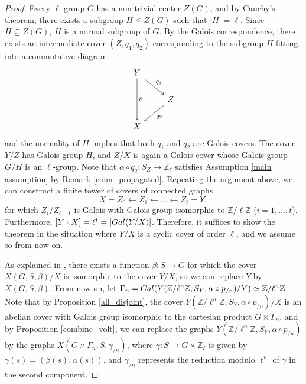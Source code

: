 \documentclass[11pt]{amsart}
\numberwithin{equation}{section}
\theoremstyle{remark}
\begin{document}
\begin{proof}
Every $\ell$-group $G$ has a non-trivial center $Z(G)$, and by Cauchy's theorem, there exists a subgroup $H \le Z(G)$ such that $|H| = \ell$.  Since $H \subseteq Z(G)$, $H$ is a normal subgroup of $G$.  By the Galois correspondence, there exists an intermediate cover $(Z,q_{1},q_{2})$ corresponding to the subgroup $H$ fitting into a commutative diagram
\begin{equation*}
\begin{tikzcd}
Y \arrow["p",dd] \arrow[rd,"q_{1}"] & \\
& Z \arrow[ld,"q_{2}"]\\
X & 
\end{tikzcd}
\end{equation*}
and the normality of $H$ implies that both $q_{1}$ and $q_{2}$ are Galois covers.  The cover $Y/Z$ has Galois group $H$, and $Z/X$ is again a Galois cover whose Galois group $G/H$ is an $\ell$-group.  Note that $\alpha \circ q_{2}:S_{Z} \rightarrow \mathbb{Z}_{\ell}$ satisfies Assumption \ref{main assumption} by Remark \ref{conn_propagated}.  Repeating the argument above, we can construct a finite tower of covers of connected graphs
$$X = Z_{0} \leftarrow Z_{1} \leftarrow \ldots \leftarrow Z_{t} = Y, $$
for which $Z_{i}/Z_{i-1}$ is Galois with Galois group isomorphic to $\mathbb{Z}/\ell\mathbb{Z}$ ($i=1,\ldots,t$).  Furthermore, $[Y:X] = \ell^{t} = |{\rm Gal}(Y/X)|$.  Therefore, it suffices to show the theorem in the situation where $Y/X$ is a cyclic cover of order $\ell$, and we assume so from now on.

As explained in \cite[Section 3]{Sage/Vallieres:2022}, there exists a function $\beta:S \rightarrow G$ for which the cover $X(G,S,\beta)/X$ is isomorphic to the cover $Y/X$, so we can replace $Y$ by $X(G,S,\beta)$.  From now on, let $\Gamma_{n} = {\rm Gal}(Y(\mathbb{Z}/\ell^{n}\mathbb{Z},S_{Y},\alpha \circ p_{/n})/Y) \simeq \mathbb{Z}/\ell^{n}\mathbb{Z}$.  Note that by Proposition \ref{all_disjoint}, the cover $Y(\mathbb{Z}/\ell^{n}\mathbb{Z},S_{Y},\alpha \circ p_{/n})/X$ is an abelian cover with Galois group isomorphic to the cartesian product $G \times \Gamma_{n}$, and by Proposition \ref{combine_volt}, we can replace the graphs $Y(\mathbb{Z}/\ell^{n}\mathbb{Z},S_{Y},\alpha \circ p_{/n})$ by the graphs $X(G \times \Gamma_{n},S,\gamma_{/n})$, where $\gamma:S \rightarrow G \times \mathbb{Z}_{\ell}$ is given by $\gamma(s) = (\beta(s),\alpha(s))$, and $\gamma_{/n}$ represents the reduction modulo $\ell^{n}$ of $\gamma$ in the second component.


\end{proof}
\end{document}
